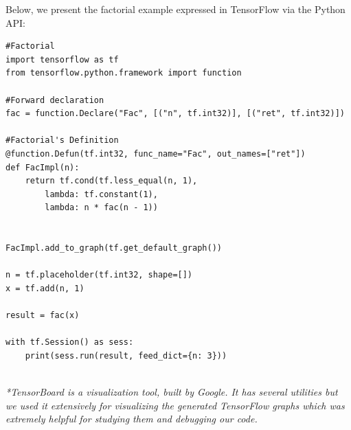 \documentclass[ack,preface]{dithesis}
\begin{document}
Below, we present the factorial example expressed in TensorFlow  via the Python API:

\begin{lstlisting}
#Factorial
import tensorflow as tf
from tensorflow.python.framework import function

#Forward declaration
fac = function.Declare("Fac", [("n", tf.int32)], [("ret", tf.int32)])

#Factorial's Definition
@function.Defun(tf.int32, func_name="Fac", out_names=["ret"])
def FacImpl(n):
	return tf.cond(tf.less_equal(n, 1),
		lambda: tf.constant(1),
		lambda: n * fac(n - 1))


FacImpl.add_to_graph(tf.get_default_graph())

n = tf.placeholder(tf.int32, shape=[])
x = tf.add(n, 1)

result = fac(x)

with tf.Session() as sess:
	print(sess.run(result, feed_dict={n: 3}))

\end{lstlisting}

\ \\

\textit{*TensorBoard is a visualization tool, built by Google. It has several utilities but we used it extensively for visualizing the generated TensorFlow graphs which was extremely helpful for studying them and debugging our code.}
\end{document}
